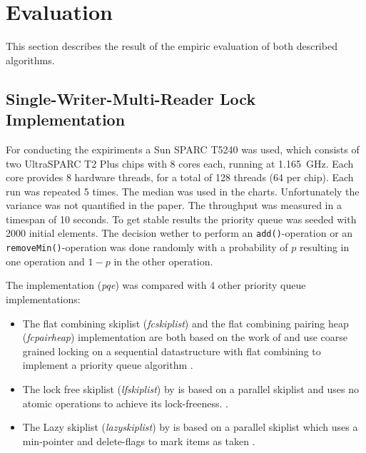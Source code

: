 
\section{Evaluation}

This section describes the result of the empiric evaluation of both described algorithms.

\subsection{Single-Writer-Multi-Reader Lock Implementation}

For conducting the expiriments a Sun SPARC T5240 was used, which consists of two UltraSPARC T2 Plus chips with 8 cores each, running at 1.165~GHz. Each core provides 8 hardware threads, for a total of 128 threads (64 per chip). Each run was repeated 5 times. The median was used in the charts. Unfortunately the variance was not quantified in the paper. The throughput was measured in a timespan of 10 seconds. To get stable results the priority queue was seeded with 2000 initial elements. The decision wether to perform an \texttt{add()}-operation or an \texttt{removeMin()}-operation was done randomly with a probability of $p$ resulting in one operation and $1-p$ in the other operation.

The implementation (\textit{pqe}) was compared with 4 other priority queue implementations:
\begin{itemize}
	\item The flat combining skiplist (\textit{fcskiplist}) and the flat combining pairing heap (\textit{fcpairheap}) implementation are both based on the work of \citeauthor{hendler_flat_2010} and use coarse grained locking on a sequential datastructure with flat combining to implement a priority queue algorithm \cite{hendler_flat_2010}.
	\item The lock free skiplist (\textit{lfskiplist}) by \citeauthor{sundell_fast_2003} is based on a parallel skiplist and uses no atomic operations to achieve its lock-freeness. \cite{sundell_fast_2003}.
	\item The Lazy skiplist (\textit{lazyskiplist}) by \citeauthor{lotan_skiplist-based_2000} is based on a parallel skiplist which uses a min-pointer and delete-flags to mark items as taken \cite{lotan_skiplist-based_2000}.
\end{itemize}

